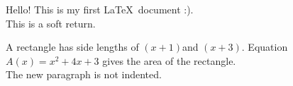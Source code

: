 \documentclass[11pt]{article}
\begin{document}
Hello! This is my first \LaTeX\ document :). \\
This is a soft return. 

A rectangle has side lengths of $(x+1)$and $(x+3)$. Equation ${A(x)= x^2+4x+3}$ gives the area of the rectangle.  \\

The new paragraph is not indented. 
\end{document}
